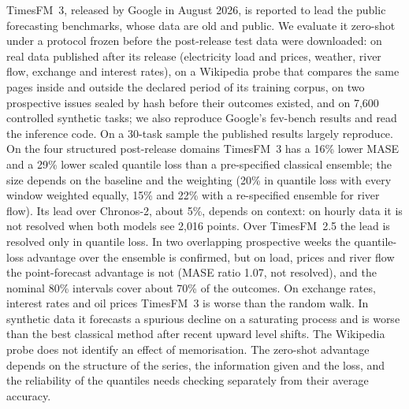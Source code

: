 TimesFM~3, released by Google in August 2026, is reported to lead the public forecasting benchmarks, whose data are old and
public. We evaluate it zero-shot under a protocol frozen before the post-release test data were downloaded: on real data published
after its release (electricity load and prices, weather, river flow, exchange and interest rates), on a Wikipedia probe that
compares the same pages inside and outside the declared period of its training corpus, on two prospective issues sealed by hash
before their outcomes existed, and on 7{,}600 controlled synthetic tasks; we also reproduce Google's fev-bench results and read the
inference code. On a 30-task sample the published results largely reproduce. On the four structured post-release domains
TimesFM~3 has a 16\% lower MASE and a 29\% lower scaled quantile loss than a pre-specified classical ensemble; the size depends on
the baseline and the weighting (20\% in quantile loss with every window weighted equally, 15\% and 22\% with a re-specified
ensemble for river flow). Its lead over Chronos-2, about 5\%, depends on context: on hourly data it is not resolved when both
models see 2{,}016 points. Over TimesFM~2.5 the lead is resolved only in quantile loss. In two overlapping prospective weeks the
quantile-loss advantage over the ensemble is confirmed, but on load, prices and river flow the point-forecast advantage is not
(MASE ratio 1.07, not resolved), and the nominal 80\% intervals cover about 70\% of the outcomes. On exchange rates, interest rates
and oil prices TimesFM~3 is worse than the random walk. In synthetic data it forecasts a spurious decline on a saturating process
and is worse than the best classical method after recent upward level shifts. The Wikipedia probe does not identify an effect of
memorisation. The zero-shot advantage depends on the structure of the series, the information given and the loss, and the
reliability of the quantiles needs checking separately from their average accuracy.
